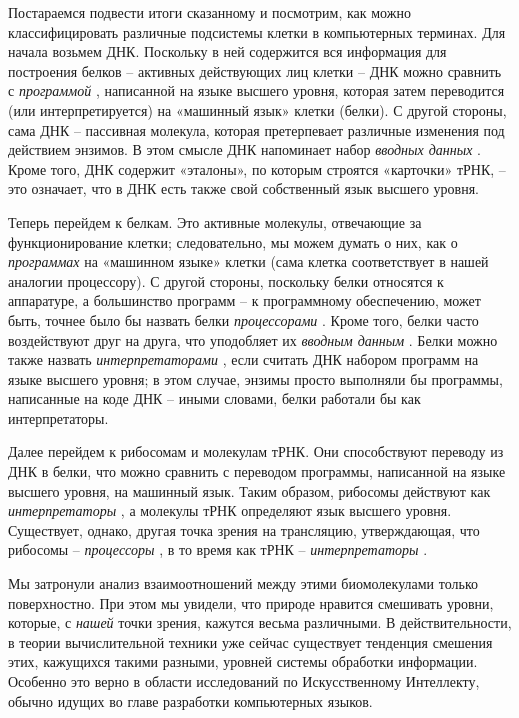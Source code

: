 \documentclass[../main.tex]{subfiles}
\begin{document}
Постараемся подвести итоги сказанному и посмотрим, как можно классифицировать различные подсистемы клетки в компьютерных терминах. Для начала возьмем ДНК\@. Поскольку в ней содержится вся информация для построения белков \--- активных действующих лиц клетки \--- ДНК можно сравнить с \emph{программой} , написанной на языке высшего уровня, которая затем переводится (или интерпретируется) на «машинный язык» клетки (белки). С другой стороны, сама ДНК \--- пассивная молекула, которая претерпевает различные изменения под действием энзимов. В этом смысле ДНК напоминает набор \emph{вводных данных} . Кроме того, ДНК содержит «эталоны», по которым строятся «карточки» тРНК, \--- это означает, что в ДНК есть также свой собственный язык высшего уровня.

Теперь перейдем к белкам. Это активные молекулы, отвечающие за функционирование клетки; следовательно, мы можем думать о них, как о \emph{программах} на «машинном языке» клетки (сама клетка соответствует в нашей аналогии процессору). С другой стороны, поскольку белки относятся к аппаратуре, а большинство программ \--- к программному обеспечению, может быть, точнее было бы назвать белки \emph{процессорами} . Кроме того, белки часто воздействуют друг на друга, что уподобляет их \emph{вводным данным} . Белки можно также назвать \emph{интерпретаторами} , если считать ДНК набором программ на языке высшего уровня; в этом случае, энзимы просто выполняли бы программы, написанные на коде ДНК \--- иными словами, белки работали бы как интерпретаторы.

Далее перейдем к рибосомам и молекулам тРНК\@. Они способствуют переводу из ДНК в белки, что можно сравнить с переводом программы, написанной на языке высшего уровня, на машинный язык. Таким образом, рибосомы действуют как \emph{интерпретаторы} , а молекулы тРНК определяют язык высшего уровня. Существует, однако, другая точка зрения на трансляцию, утверждающая, что рибосомы \--- \emph{процессоры} , в то время как тРНК \--- \emph{интерпретаторы} .

Мы затронули анализ взаимоотношений между этими биомолекулами только поверхностно. При этом мы увидели, что природе нравится смешивать уровни, которые, с \emph{нашей} точки зрения, кажутся весьма различными. В действительности, в теории вычислительной техники уже сейчас существует тенденция смешения этих, кажущихся такими разными, уровней системы обработки информации. Особенно это верно в области исследований по Искусственному Интеллекту, обычно идущих во главе разработки компьютерных языков.
\end{document}
